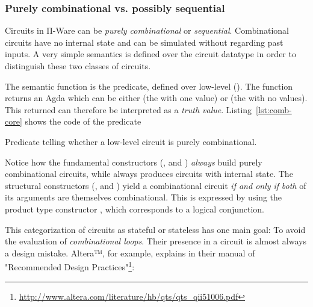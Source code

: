             \subsubsection{Purely combinational vs. possibly sequential}
            Circuits in Π-Ware can be \emph{purely combinational} or \emph{sequential}.
            Combinational circuits have no internal state and can be simulated without regarding past inputs.
            A very simple semantics is defined over the circuit datatype in order to distinguish
            these two classes of circuits.

            The semantic function is the  predicate, defined over low-level ().
            The  function returns an Agda  which can be either 
            (the  with one value) or  (the  with no values).
            This returned  can therefore be interpreted as a \emph{truth value}.
            Listing~\ref{lst:comb-core} shows the code of the  predicate

            \begin{listing}[h]
                \caption{Predicate telling whether a low-level circuit is purely combinational.\label{lst:comb-core}}
            \end{listing}

            Notice how the fundamental constructors (,  and ) \emph{always}
            build purely combinational circuits, while  always produces circuits with internal state.
            The structural constructors (,  and ) yield a combinational circuit
            \emph{if and only if} \emph{both} of its arguments are themselves combinational.
            This is expressed by using the product type constructor ,
            which corresponds to a logical conjunction.

            This categorization of circuits as stateful or stateless has one main goal:
            To avoid the evaluation of \emph{combinational loops}.
            Their presence in a circuit is almost always a design mistake.
            Altera™, for example, explains in their manual of "Recommended Design
            Practices"\footnote{\url{http://www.altera.com/literature/hb/qts/qts\_qii51006.pdf}}:

